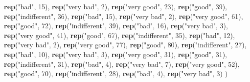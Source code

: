 \documentclass[
  french,
]{book}
\newenvironment{Shaded}{\begin{snugshade}}{\end{snugshade}}
\newcommand{\DecValTok}[1]{\textcolor[rgb]{0.00,0.00,0.81}{#1}}
\newcommand{\KeywordTok}[1]{\textcolor[rgb]{0.13,0.29,0.53}{\textbf{#1}}}
\newcommand{\NormalTok}[1]{#1}
\newcommand{\StringTok}[1]{\textcolor[rgb]{0.31,0.60,0.02}{#1}}
\begin{document}
\begin{Shaded}
\begin{Highlighting}[]
  \KeywordTok{rep}\NormalTok{(}\StringTok{"bad"}\NormalTok{, }\DecValTok{15}\NormalTok{), }\KeywordTok{rep}\NormalTok{(}\StringTok{"very bad"}\NormalTok{, }\DecValTok{2}\NormalTok{), }
  \KeywordTok{rep}\NormalTok{(}\StringTok{"very good"}\NormalTok{, }\DecValTok{23}\NormalTok{), }\KeywordTok{rep}\NormalTok{(}\StringTok{"good"}\NormalTok{, }\DecValTok{39}\NormalTok{), }\KeywordTok{rep}\NormalTok{(}\StringTok{"indifferent"}\NormalTok{, }\DecValTok{36}\NormalTok{), }
  \KeywordTok{rep}\NormalTok{(}\StringTok{"bad"}\NormalTok{, }\DecValTok{15}\NormalTok{), }\KeywordTok{rep}\NormalTok{(}\StringTok{"very bad"}\NormalTok{, }\DecValTok{2}\NormalTok{), }
  \KeywordTok{rep}\NormalTok{(}\StringTok{"very good"}\NormalTok{, }\DecValTok{61}\NormalTok{), }\KeywordTok{rep}\NormalTok{(}\StringTok{"good"}\NormalTok{, }\DecValTok{72}\NormalTok{), }\KeywordTok{rep}\NormalTok{(}\StringTok{"indifferent"}\NormalTok{, }\DecValTok{39}\NormalTok{), }
  \KeywordTok{rep}\NormalTok{(}\StringTok{"bad"}\NormalTok{, }\DecValTok{16}\NormalTok{), }\KeywordTok{rep}\NormalTok{(}\StringTok{"very bad"}\NormalTok{, }\DecValTok{3}\NormalTok{), }
  \KeywordTok{rep}\NormalTok{(}\StringTok{"very good"}\NormalTok{, }\DecValTok{41}\NormalTok{), }\KeywordTok{rep}\NormalTok{(}\StringTok{"good"}\NormalTok{, }\DecValTok{67}\NormalTok{), }\KeywordTok{rep}\NormalTok{(}\StringTok{"indifferent"}\NormalTok{, }\DecValTok{35}\NormalTok{), }
  \KeywordTok{rep}\NormalTok{(}\StringTok{"bad"}\NormalTok{, }\DecValTok{12}\NormalTok{), }\KeywordTok{rep}\NormalTok{(}\StringTok{"very bad"}\NormalTok{, }\DecValTok{2}\NormalTok{), }
  \KeywordTok{rep}\NormalTok{(}\StringTok{"very good"}\NormalTok{, }\DecValTok{77}\NormalTok{), }\KeywordTok{rep}\NormalTok{(}\StringTok{"good"}\NormalTok{, }\DecValTok{80}\NormalTok{), }\KeywordTok{rep}\NormalTok{(}\StringTok{"indifferent"}\NormalTok{, }\DecValTok{27}\NormalTok{), }
  \KeywordTok{rep}\NormalTok{(}\StringTok{"bad"}\NormalTok{, }\DecValTok{10}\NormalTok{), }\KeywordTok{rep}\NormalTok{(}\StringTok{"very bad"}\NormalTok{, }\DecValTok{3}\NormalTok{), }
  \KeywordTok{rep}\NormalTok{(}\StringTok{"very good"}\NormalTok{, }\DecValTok{31}\NormalTok{), }\KeywordTok{rep}\NormalTok{(}\StringTok{"good"}\NormalTok{, }\DecValTok{31}\NormalTok{), }\KeywordTok{rep}\NormalTok{(}\StringTok{"indifferent"}\NormalTok{, }\DecValTok{31}\NormalTok{), }
  \KeywordTok{rep}\NormalTok{(}\StringTok{"bad"}\NormalTok{, }\DecValTok{4}\NormalTok{), }\KeywordTok{rep}\NormalTok{(}\StringTok{"very bad"}\NormalTok{, }\DecValTok{7}\NormalTok{), }
  \KeywordTok{rep}\NormalTok{(}\StringTok{"very good"}\NormalTok{, }\DecValTok{52}\NormalTok{), }\KeywordTok{rep}\NormalTok{(}\StringTok{"good"}\NormalTok{, }\DecValTok{70}\NormalTok{), }\KeywordTok{rep}\NormalTok{(}\StringTok{"indifferent"}\NormalTok{, }\DecValTok{28}\NormalTok{), }
  \KeywordTok{rep}\NormalTok{(}\StringTok{"bad"}\NormalTok{, }\DecValTok{4}\NormalTok{), }\KeywordTok{rep}\NormalTok{(}\StringTok{"very bad"}\NormalTok{, }\DecValTok{3}\NormalTok{)}
\NormalTok{  )}


\end{Highlighting}
\end{Shaded}
\end{document}
